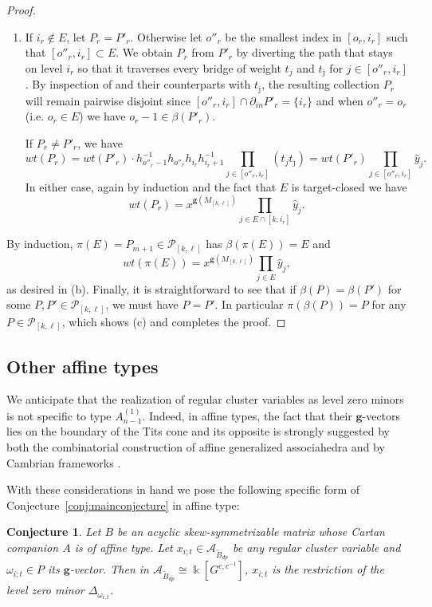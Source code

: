 \documentclass[12pt]{amsart}
\newcommand{\cA}{\mathcal{A}}
\newcommand{\kk}{\Bbbk}
\newcommand{\bfg}{\mathbf{g}}
\newcommand{\grep}{\bfg}
\newcommand{\gv}{\omega}
\newcommand{\cP}{\mathcal{P}}
\newcommand{\ol}[1]{\overline{#1}}
\newcommand{\Bdp}{\widetilde{B}_{dp}}
\newcommand{\Qrep}{M}
\newtheorem{conjecture}[theorem]{Conjecture}
\theoremstyle{remark}
\numberwithin{equation}{section}
\numberwithin{figure}{section}
\begin{document}
\begin{proof}
\begin{enumerate}
    \item 
      If $i_r \notin E$, let $P_r = P'_r$.
      Otherwise let $o''_r$ be the smallest index in $[o_r,i_r]$ such that $[o''_r,i_r]\subset E$.
      We obtain $P_r$ from $P'_r$ by diverting the path that stays on level $i_r$ so that it traverses every bridge of weight $t_j$ and $t_{\ol{\jmath}}$ for $j\in[o''_r,i_r]$.
      By inspection of  and their counterparts with $t_{\ol{\jmath}}$, the resulting collection $P_r$ will remain pairwise disjoint since $[o''_r,i_r]\cap\partial_{in}P'_r=\{i_r\}$ and when $o''_r=o_r$ (i.e. $o_r\in E$) we have $o_r-1\in\beta(P'_r)$.
  
      If $P_r \neq P'_r$, we have 
      \[
        wt(P_r)=wt(P'_r)\cdot h_{o''_r-1}^{-1}h_{o''_r}h_{i_r}h_{i_r+1}^{-1}\prod_{j\in[o''_r,i_r]}(t_jt_{\ol{\jmath}})=wt(P'_r)\prod_{j \in [o''_r,i_r]} \hat{y}_j.
      \] 
      In either case, again by induction and the fact that $E$ is target-closed we have
      \[
        wt(P_r) = x^{\grep(\Qrep_{[k,\ell]})} \prod_{j \in E \cap [k,i_r]} \hat{y}_j.
      \]
  \end{enumerate}
  By induction, $\pi(E)=P_{m+1} \in \cP_{[k,\ell]}$ has $\beta(\pi(E))=E$ and 
  \[
    wt(\pi(E))=x^{\grep(\Qrep_{[k,\ell]})}\prod_{j\in E}\hat y_j,
  \]
  as desired in (b).
  Finally, it is straightforward to see that if $\beta(P) = \beta(P')$ for some $P, P' \in \cP_{[k,\ell]}$, we must have $P = P'$.
  In particular $\pi(\beta(P))=P$ for any $P\in\cP_{[k,\ell]}$, which shows (c) and completes the proof.
\end{proof}

\subsection{Other affine types}
\label{sec:othertypes}

We anticipate that the realization of regular cluster variables as level zero minors is not specific to type $A_{n-1}^{\!(1)}$.
Indeed, in affine types, the fact that their $\bfg$-vectors lies on the boundary of the Tits cone and its opposite is strongly suggested by both the combinatorial construction of affine generalized associahedra \cite{RS16} and by Cambrian frameworks \cite{RS15}.

With these considerations in hand we pose the following specific form of Conjecture~\ref{conj:mainconjecture} in affine type:

\begin{conjecture}
  \label{conj:affine}
  Let $B$ be an acyclic skew-symmetrizable matrix whose Cartan companion $A$ is of affine type.
  Let $x_{i;t} \in \cA_{\Bdp}$ be any regular cluster variable and $\gv_{i;t} \in P$ its $\bfg$-vector.
  Then in $\cA_{\Bdp} \cong \kk[G^{c,c^{-1}}]$, $x_{i;t}$ is the restriction of the level zero minor $\Delta_{\gv_{i;t}}$.
\end{conjecture}
\end{document}

